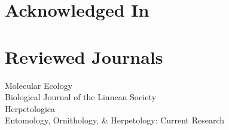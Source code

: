 \documentclass[11pt,a4paper,sans]{moderncv}        %
\begin{document}
\section{Acknowledged In}
\begin{refsection}
\nocite{*}
\printbibliography[heading=none]
\end{refsection}

\section{Reviewed Journals}
Molecular Ecology \\
Biological Journal of the Linnean Society \\
Herpetologica \\
Entomology, Ornithology, \& Herpetology: Current Research \\
\end{document}
